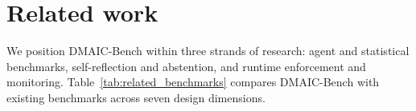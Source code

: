 \documentclass{article}
\begin{document}
\section{Related work}
\label{sec:related}

We position DMAIC-Bench within three strands of research: agent and statistical benchmarks, self-reflection and abstention, and runtime enforcement and monitoring. Table~\ref{tab:related_benchmarks} compares DMAIC-Bench with existing benchmarks across seven design dimensions.

\begin{table}[!ht]
\caption{Comparison of benchmark design dimensions. \checkmark: dedicated component; $\times$: outside the benchmark's target; $\triangle$: related but indirect component; ---: not established by the cited description. For DMAIC-Bench the human column marks human-derived reference routes (eight cases follow black-belt closure reports) and expert confirmation of gate labels, not a measured human score.}
\label{tab:related_benchmarks}
\centering
\small
\setlength{\tabcolsep}{2.5pt}


\end{table}
\end{document}
